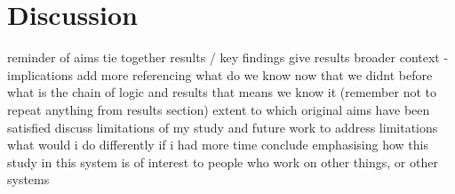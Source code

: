 \documentclass[11pt, titlepage]{article}
\begin{document}
    \section*{Discussion}

    reminder of aims
    tie together results / key findings
    give results broader context - implications
    add more referencing
    what do we know now that we didnt before
    what is the chain of logic and results that means we know it (remember not to repeat anything from results section)
    extent to which original aims have been satisfied
    discuss limitations of my study and future work to address limitations
    what would i do differently if i had more time
    conclude emphasising how this study in this system is of interest to people who work on other things, or other systems

    

    
\end{document}
